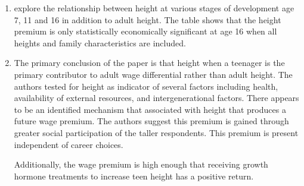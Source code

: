 \documentclass[12pt]{article}
\begin{document}
\begin{enumerate}[\indent a.]
        \item \citeauthor{Persico2004} explore the relationship between height 
        at various stages of development age 7, 11 and 16 in addition to adult 
        height.  The table shows that the height premium is only statistically 
        economically significant at age 16 when all heights and family 
        characteristics are included.
        
        \item The primary conclusion of the paper is that height when a 
        teenager is the primary contributor to adult wage differential rather 
        than adult height.  The authors tested for height as indicator of 
        several factors including health, availability of external resources, 
        and intergenerational factors.  There appears to be an identified 
        mechanism that associated with height that produces a future wage 
        premium. The authors suggest this premium is gained through greater 
        social participation of the taller respondents. This premium is present 
        independent of career choices. 
        
        Additionally, the wage premium is high enough that receiving growth 
        hormone treatments to increase teen height has a positive return.
    \end{enumerate}
\end{document}
